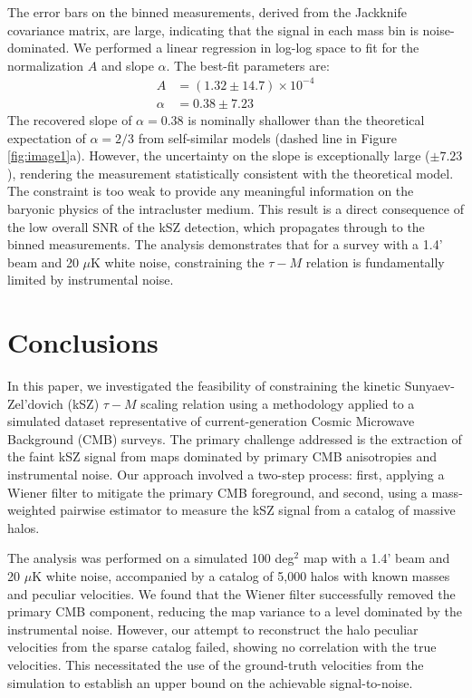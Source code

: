 \documentclass[]{article}
\begin{document}
The error bars on the binned measurements, derived from the Jackknife covariance matrix, are large, indicating that the signal in each mass bin is noise-dominated. We performed a linear regression in log-log space to fit for the normalization $A$ and slope $\alpha$. The best-fit parameters are:
\begin{align}
    A &= (1.32 \pm 14.7) \times 10^{-4} \\
    \alpha &= 0.38 \pm 7.23
\end{align}
The recovered slope of $\alpha = 0.38$ is nominally shallower than the theoretical expectation of $\alpha = 2/3$ from self-similar models (dashed line in Figure \ref{fig:image1}a). However, the uncertainty on the slope is exceptionally large ($\pm 7.23$), rendering the measurement statistically consistent with the theoretical model. The constraint is too weak to provide any meaningful information on the baryonic physics of the intracluster medium. This result is a direct consequence of the low overall SNR of the kSZ detection, which propagates through to the binned measurements. The analysis demonstrates that for a survey with a 1.4' beam and 20 $\mu$K white noise, constraining the $\tau-M$ relation is fundamentally limited by instrumental noise.

\section{Conclusions}
\label{sec:conclusions}
In this paper, we investigated the feasibility of constraining the kinetic Sunyaev-Zel'dovich (kSZ) $\tau-M$ scaling relation using a methodology applied to a simulated dataset representative of current-generation Cosmic Microwave Background (CMB) surveys. The primary challenge addressed is the extraction of the faint kSZ signal from maps dominated by primary CMB anisotropies and instrumental noise. Our approach involved a two-step process: first, applying a Wiener filter to mitigate the primary CMB foreground, and second, using a mass-weighted pairwise estimator to measure the kSZ signal from a catalog of massive halos.

The analysis was performed on a simulated 100 deg$^2$ map with a 1.4' beam and 20 $\mu$K white noise, accompanied by a catalog of 5,000 halos with known masses and peculiar velocities. We found that the Wiener filter successfully removed the primary CMB component, reducing the map variance to a level dominated by the instrumental noise. However, our attempt to reconstruct the halo peculiar velocities from the sparse catalog failed, showing no correlation with the true velocities. This necessitated the use of the ground-truth velocities from the simulation to establish an upper bound on the achievable signal-to-noise.
\end{document}
